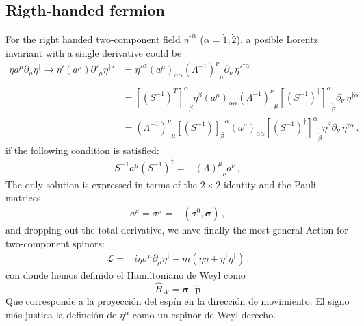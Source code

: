 \subsection{Rigth-handed fermion}

\begin{frame}
For the right handed two-component field ${\eta^{\dagger}}^{\dot{\alpha}}$ ($\dot{\alpha}=\dot{1},\dot{2}$). a posible Lorentz invariant with a single derivative could be 
 \begin{align}
   {\eta}a^\mu\partial_\mu\eta^{\dagger}\to  {\eta'}\left(a^\mu\right)\partial'_\mu{\eta^{\dagger}}'
&={\eta'}^{\alpha}\left( a^\mu \right)_{\alpha\dot{\alpha}}{\left(\Lambda^{-1}\right)^\nu}_\mu\partial_\nu \,{\eta'}^{\dagger\dot{\alpha}}\nonumber\\
&={\left[ \left( S^{-1} \right)^T \right]^{\alpha}}_{\beta}{\eta}^{\beta}\left( a^\mu \right)_{\alpha\dot{\alpha}}{\left(\Lambda^{-1}\right)^\nu}_\mu {\left[ \left( S^{-1} \right)^\dagger \right]^{\dot{\alpha}}}_{\dot{\beta}}\partial_\nu \,{\eta}^{\dagger\dot{\alpha}}\nonumber\\
&={\left(\Lambda^{-1}\right)^\nu}_\mu{\left[ \left( S^{-1} \right) \right]_{\beta}}^{\alpha}\left( a^\mu \right)_{\alpha\dot{\alpha}}{\left[ \left( S^{-1} \right)^\dagger \right]^{\dot{\alpha}}}_{\dot{\beta}} {\eta}^{\beta}\partial_\nu \,{\eta}^{\dagger\dot{\alpha}}\,.
\end{align}
if the following condition is satisfied:
\begin{align}
\label{eq:ltrincond}
S^{-1}a^\mu \left( S^{-1} \right)^{\dagger}=&{\left(\Lambda\right)^\mu}_\nu a^\nu\,,
\end{align}
The only solution is expressed in terms of the $2\times2$ identity and the Pauli matrices
   \begin{align} 
 a^{\mu}={\sigma}^{\mu} =& \left( \sigma^0,{\boldsymbol{\sigma}} \right)\,, 
\end{align}
and dropping out the total derivative, we have finally the most general Action for two-component spinors:
\begin{align}
  \mathcal{L}=&i{\eta}{\sigma}^\mu\partial_\mu\eta^{\dagger}-
m \left( \eta\eta+\eta^{\dagger}\eta^{\dagger} \right)\,.
\end{align}
con donde hemos definido el Hamiltoniano de Weyl como
\begin{equation}
  \label{eq:denshal}
  \hat{H}_W= \mathbf{\sigma}\cdot\widehat{\mathbf{p}}
\end{equation}
Que corresponde a la proyección del espín en la dirección de movimiento. El signo más justica la definción de $\eta^{\dot{\alpha}}$ como un espinor de Weyl derecho.
\end{frame}

